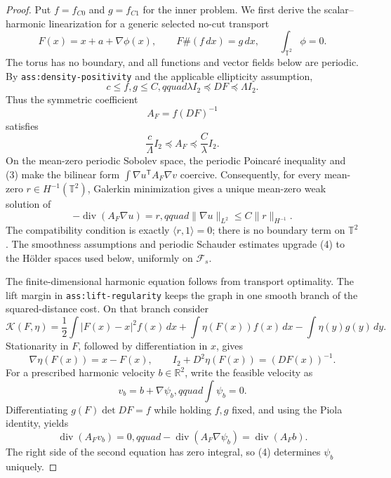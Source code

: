 \documentclass{article}
\begin{document}
\begin{proof}
Put \(f=f_{C0}\) and \(g=f_{C1}\) for the inner problem.  We first derive the scalar--harmonic linearization for a generic selected no-cut transport
\[
 F(x)=x+a+\nabla\phi(x),\qquad F\#(f\,dx)=g\,dx,
 \qquad \int_{\mathbb T^2}\phi=0.                                      \tag{1}
\]
The torus has no boundary, and all functions and vector fields below are periodic.  By \texttt{ass:density-positivity} and the applicable ellipticity assumption,
\[
 c\leq f,g\leq C,qquad
 \lambda I_2\preceq DF\preceq\Lambda I_2.                              \tag{2}
\]
Thus the symmetric coefficient
\[
 A_F=f(DF)^{-1}
\]
satisfies
\[
 \frac{c}{\Lambda}I_2\preceq A_F\preceq\frac{C}{\lambda}I_2.           \tag{3}
\]
On the mean-zero periodic Sobolev space, the periodic Poincar\'e inequality and (3) make the bilinear form \(\int\nabla u^{\mathsf T}A_F\nabla v\) coercive.  Consequently, for every mean-zero \(r\in H^{-1}(\mathbb T^2)\), Galerkin minimization gives a unique mean-zero weak solution of
\[
 -\operatorname{div}(A_F\nabla u)=r,qquad
 \|\nabla u\|_{L^2}\leq C\|r\|_{H^{-1}}.                              \tag{4}
\]
The compatibility condition is exactly \(\langle r,1\rangle=0\); there is no boundary term on \(\mathbb T^2\).  The smoothness assumptions and periodic Schauder estimates upgrade (4) to the H\"older spaces used below, uniformly on \(\mathcal F_s\).

The finite-dimensional harmonic equation follows from transport optimality.  The lift margin in \texttt{ass:lift-regularity} keeps the graph in one smooth branch of the squared-distance cost.  On that branch consider
\[
 \mathcal K(F,\eta)=\frac12\int|F(x)-x|^2f(x)\,dx
 +\int\eta(F(x))f(x)\,dx-\int\eta(y)g(y)\,dy.                           \tag{5}
\]
Stationarity in \(F\), followed by differentiation in \(x\), gives
\[
 \nabla\eta(F(x))=x-F(x),\qquad
 I_2+D^2\eta(F(x))=(DF(x))^{-1}.                                       \tag{6}
\]
For a prescribed harmonic velocity \(b\in\mathbb R^2\), write the feasible velocity as
\[
 v_b=b+\nabla\psi_b,qquad \int\psi_b=0.                               \tag{7}
\]
Differentiating \(g(F)\det DF=f\) while holding \(f,g\) fixed, and using the Piola identity, yields
\[
 \operatorname{div}(A_Fv_b)=0,qquad
 -\operatorname{div}(A_F\nabla\psi_b)=\operatorname{div}(A_Fb).        \tag{8}
\]
The right side of the second equation has zero integral, so (4) determines \(\psi_b\) uniquely.


\end{proof}
\end{document}
